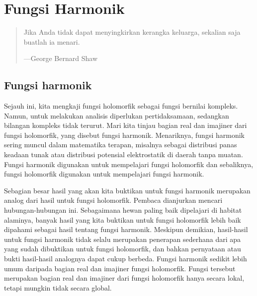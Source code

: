 \documentclass[12pt,openany]{book}
\theoremstyle{plain}
\theoremstyle{remark}
\theoremstyle{definition}
\newenvironment{myepigraph}{%
    \begin{quote}%
    \begingroup\itshape
}{%
    \endgroup%
    \end{quote}
}
\theoremstyle{exercise}
\theoremstyle{example}
\begin{document}

\chapter{Fungsi Harmonik} \label{ch:harmonic}

\begin{myepigraph}
Jika Anda tidak dapat menyingkirkan kerangka keluarga, sekalian saja buatlah ia
menari.

---George Bernard Shaw
\end{myepigraph}


\section{Fungsi harmonik}
\label{sec:harmonic}

Sejauh ini, kita mengkaji fungsi holomorfik sebagai fungsi bernilai kompleks.
Namun, untuk melakukan analisis diperlukan pertidaksamaan, sedangkan bilangan kompleks tidak
terurut. Mari kita tinjau bagian real dan imajiner dari fungsi holomorfik,
yang disebut fungsi harmonik. Menariknya, fungsi
harmonik sering muncul dalam matematika terapan, misalnya sebagai distribusi panas
keadaan tunak atau distribusi potensial elektrostatik di daerah tanpa
muatan. Fungsi harmonik digunakan untuk mempelajari
fungsi holomorfik dan sebaliknya, fungsi holomorfik digunakan untuk
mempelajari fungsi harmonik.

Sebagian besar hasil
yang akan kita buktikan untuk fungsi harmonik merupakan analog dari hasil
untuk fungsi holomorfik. Pembaca dianjurkan
mencari hubungan-hubungan ini.
Sebagaimana hewan paling baik dipelajari di habitat alaminya,
banyak hasil yang kita buktikan untuk fungsi holomorfik
lebih baik dipahami sebagai hasil tentang fungsi harmonik.
Meskipun demikian, hasil-hasil untuk fungsi harmonik tidak
selalu merupakan penerapan sederhana dari apa yang sudah dibuktikan untuk fungsi
holomorfik, dan bahkan
pernyataan atau bukti hasil-hasil analognya dapat cukup berbeda.
Fungsi harmonik sedikit lebih umum daripada bagian real dan
imajiner fungsi holomorfik. Fungsi tersebut merupakan bagian real dan imajiner
dari fungsi holomorfik hanya secara lokal, tetapi mungkin tidak secara global.
\end{document}
